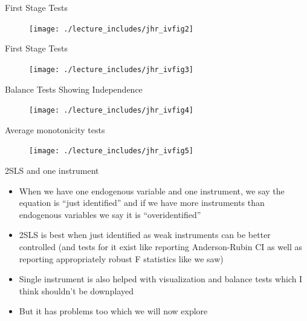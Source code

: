 \documentclass{beamer}
\begin{document}
\begin{frame}{First Stage Tests}
	\begin{figure}
             \centering
             \texttt{[image: ./lecture\_includes/jhr\_ivfig2]}
	\end{figure}
\end{frame}

\begin{frame}{First Stage Tests}
	\begin{figure}
             \centering
             \texttt{[image: ./lecture\_includes/jhr\_ivfig3]}
	\end{figure}
\end{frame}

\begin{frame}{Balance Tests Showing Independence}
	\begin{figure}
             \centering
             \texttt{[image: ./lecture\_includes/jhr\_ivfig4]}
	\end{figure}
\end{frame}

\begin{frame}{Average monotonicity tests}
	\begin{figure}
             \centering
             \texttt{[image: ./lecture\_includes/jhr\_ivfig5]}
	\end{figure}
\end{frame}










\begin{frame}{2SLS and one instrument}

\begin{itemize}

\item When we have one endogenous variable and one instrument, we say the equation is ``just identified'' and if we have more instruments than endogenous variables we say it is ``overidentified''
\item 2SLS is best when just identified as weak instruments can be better controlled (and tests for it exist like reporting Anderson-Rubin CI as well as reporting appropriately robust F statistics like we saw)
\item Single instrument is also helped with visualization and balance tests which I think shouldn't be downplayed
\item But it has problems too which we will now explore

\end{itemize}

\end{frame}
\end{document}

